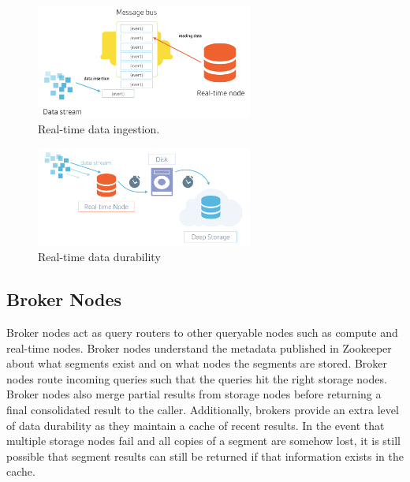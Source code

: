 \documentclass{vldb}
\begin{document}
\begin{figure}
\centering
\includegraphics[width = 2.8in]{data_reading}
\caption{Real-time data ingestion.}
\label{fig:data_reading}
\end{figure}

\begin{figure}
\centering
\includegraphics[width = 2.8in]{druid_realtime_flow}
\caption{Real-time data durability}
\label{fig:data-durability}
\end{figure}

\subsection{Broker Nodes}
Broker nodes act as query routers to other queryable nodes such as
compute and real-time nodes. Broker nodes understand the metadata
published in Zookeeper about what segments exist and on what nodes the
segments are stored. Broker nodes route incoming queries such that the queries hit
the right storage nodes. Broker nodes also merge partial results from
storage nodes before returning a final consolidated result to the
caller.  Additionally, brokers provide an extra level of data
durability as they maintain a cache of recent results. In the event
that multiple storage nodes fail and all copies of a segment are
somehow lost, it is still possible that segment results can still be
returned if that information exists in the cache.
\end{document}
